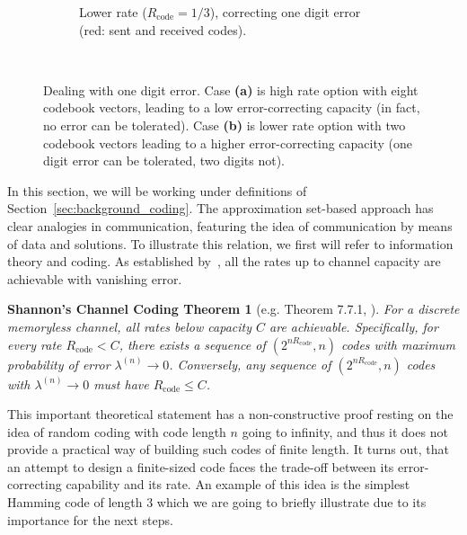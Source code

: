 \begin{figure}[th!]
\begin{subfigure}[b]{.85\textwidth}
      \caption{Lower rate ($R_{\text{code}} = 1/3$), correcting one digit error
      (red: sent and received codes).}
      \label{fig:boolen_cube_vectors_error_2}
  \end{subfigure}
  \\[.5cm]
  \caption{Dealing with one digit error. Case \textbf{(a)}
    is high rate option with eight codebook vectors, leading to a low
    error-correcting capacity (in fact, no error can be tolerated). Case
    \textbf{(b)} is lower rate option with two codebook vectors leading to a
    higher error-correcting capacity (one digit error can be tolerated, two
    digits not).}
  \label{fig:boolen_cube_vectors_error}
\end{figure}

In this section, we will be working under definitions of
Section~\ref{sec:background_coding}. The approximation set-based approach has clear
analogies in communication, featuring the idea of communication by means of data
and solutions. To illustrate this relation, we first will refer to information
theory and coding. As established by~\citet{shannon:1948, shannon:1963}, all the
rates up to channel capacity are achievable with vanishing error.

\newtheorem*{shannon_thm}{Shannon's Channel Coding Theorem}
\begin{shannon_thm}[e.g. Theorem 7.7.1, \citealp{Cover:2006}]
  For a discrete memoryless channel, all rates below capacity $C$ are
  achievable. Specifically, for every rate $R_{\text{code}} < C$, there exists a sequence of
  $(2^{nR_{\text{code}}}, n)$ codes with maximum probability of error $\lambda^{(n)} \to 0$.
  Conversely, any sequence of $(2^{nR_{\text{code}}}, n)$ codes with $\lambda^{(n)} \to 0$
  must have $R_{\text{code}} \le C$.
\end{shannon_thm}

This important theoretical statement has a non-constructive
proof resting on the idea of random coding with code length $n$ going to
infinity, and thus it does not provide a practical way of building such codes of
finite length. It turns out, that an attempt to design a finite-sized code faces
the trade-off between its error-correcting capability and its rate. An example
of this idea is the simplest Hamming code of length $3$ which we are going to
briefly illustrate due to its importance for the next steps.


